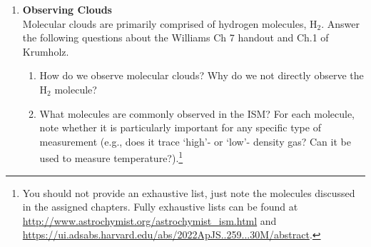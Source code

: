 \documentclass{article}
\begin{document}
\begin{enumerate}
\item  \textbf{Observing Clouds} \\
    Molecular clouds are primarily comprised of hydrogen molecules, H$_2$.
    Answer the following questions about the Williams Ch 7 handout
    and Ch.1 of Krumholz.

    \begin{enumerate}
        \item How do we observe molecular clouds?
            Why do we not directly observe the H$_2$ molecule?
        \item What molecules are commonly observed in the ISM?
            For each molecule, note whether it is particularly important for any specific type
            of measurement (e.g., does it trace `high'- or `low'- density gas?  Can it be
            used to measure temperature?).\footnote{
            You should not provide an exhaustive list, just note the molecules discussed in the
            assigned chapters.  Fully exhaustive lists can be found at
            \url{http://www.astrochymist.org/astrochymist_ism.html} and
            \url{https://ui.adsabs.harvard.edu/abs/2022ApJS..259...30M/abstract}.}
    \end{enumerate}

\end{enumerate}




\end{document}
